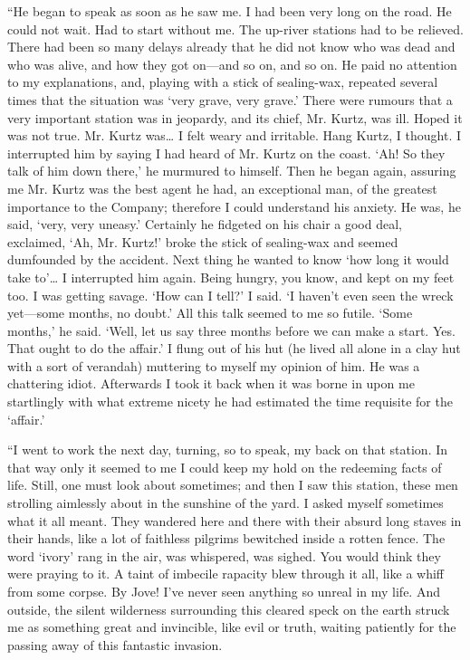 \documentclass[12pt]{report}
\begin{document}
``He began to speak as soon as he saw me. I had been very long on the
road. He could not wait. Had to start without me. The up-river stations
had to be relieved. There had been so many delays already that he did
not know who was dead and who was alive, and how they got on---and so
on, and so on. He paid no attention to my explanations, and, playing
with a stick of sealing-wax, repeated several times that the situation
was `very grave, very grave.' There were rumours that a very important
station was in jeopardy, and its chief, Mr. Kurtz, was ill. Hoped it was
not true. Mr. Kurtz was\ldots{} I felt weary and irritable. Hang Kurtz,
I thought. I interrupted him by saying I had heard of Mr. Kurtz on the
coast. `Ah! So they talk of him down there,' he murmured to himself.
Then he began again, assuring me Mr. Kurtz was the best agent he had, an
exceptional man, of the greatest importance to the Company; therefore I
could understand his anxiety. He was, he said, `very, very uneasy.'
Certainly he fidgeted on his chair a good deal, exclaimed, `Ah, Mr.
Kurtz!' broke the stick of sealing-wax and seemed dumfounded by the
accident. Next thing he wanted to know `how long it would take
to'\ldots{} I interrupted him again. Being hungry, you know, and kept on
my feet too. I was getting savage. `How can I tell?' I said. `I haven't
even seen the wreck yet---some months, no doubt.' All this talk seemed
to me so futile. `Some months,' he said. `Well, let us say three months
before we can make a start. Yes. That ought to do the affair.' I flung
out of his hut (he lived all alone in a clay hut with a sort of
verandah) muttering to myself my opinion of him. He was a chattering
idiot. Afterwards I took it back when it was borne in upon me
startlingly with what extreme nicety he had estimated the time requisite
for the `affair.'

``I went to work the next day, turning, so to speak, my back on that
station. In that way only it seemed to me I could keep my hold on the
redeeming facts of life. Still, one must look about sometimes; and then
I saw this station, these men strolling aimlessly about in the sunshine
of the yard. I asked myself sometimes what it all meant. They wandered
here and there with their absurd long staves in their hands, like a lot
of faithless pilgrims bewitched inside a rotten fence. The word `ivory'
rang in the air, was whispered, was sighed. You would think they were
praying to it. A taint of imbecile rapacity blew through it all, like a
whiff from some corpse. By Jove! I've never seen anything so unreal in
my life. And outside, the silent wilderness surrounding this cleared
speck on the earth struck me as something great and invincible, like
evil or truth, waiting patiently for the passing away of this fantastic
invasion.
\end{document}
